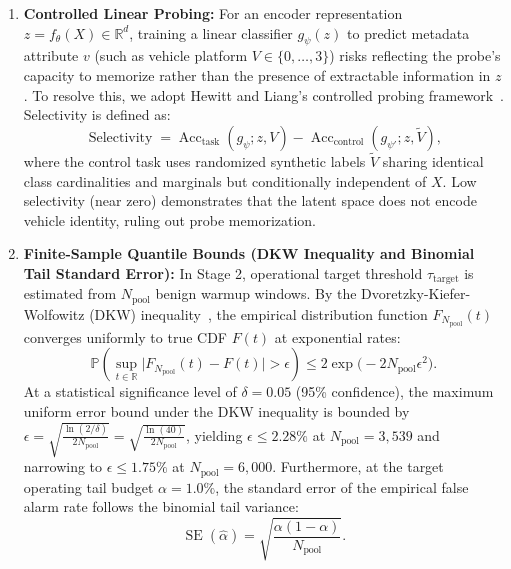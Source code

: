 \documentclass[12pt, a4paper, reqno, oneside]{book}
\begin{document}
\begin{enumerate}
    \item \textbf{Controlled Linear Probing:} For an encoder representation $z = f_\theta(X) \in \mathbb{R}^d$, training a linear classifier $g_\psi(z)$ to predict metadata attribute $v$ (such as vehicle platform $V \in \{0, \ldots, 3\}$) risks reflecting the probe's capacity to memorize rather than the presence of extractable information in $z$. To resolve this, we adopt Hewitt and Liang's controlled probing framework~\cite{hewitt2019probes}. Selectivity is defined as:
    \begin{equation}\label{eq:probe-selectivity}
    \operatorname{Selectivity} = \operatorname{Acc}_{\text{task}}(g_\psi; z, V) - \operatorname{Acc}_{\text{control}}(g_{\psi'}; z, \widetilde{V}),
    \end{equation}
    where the control task uses randomized synthetic labels $\widetilde{V}$ sharing identical class cardinalities and marginals but conditionally independent of $X$. Low selectivity (near zero) demonstrates that the latent space does not encode vehicle identity, ruling out probe memorization.
    \item \textbf{Finite-Sample Quantile Bounds (DKW Inequality and Binomial Tail Standard Error):} In Stage 2, operational target threshold $\tau_{\text{target}}$ is estimated from $N_{\text{pool}}$ benign warmup windows. By the Dvoretzky-Kiefer-Wolfowitz (DKW) inequality~\cite{massart1990dkw}, the empirical distribution function $F_{N_{\text{pool}}}(t)$ converges uniformly to true CDF $F(t)$ at exponential rates:
    \begin{equation}\label{eq:dkw-inequality}
    \mathbb{P}\left(\sup_{t \in \mathbb{R}} \big| F_{N_{\text{pool}}}(t) - F(t) \big| > \epsilon\right) \le 2\exp\big(-2 N_{\text{pool}} \epsilon^2\big).
    \end{equation}
    At a statistical significance level of $\delta = 0.05$ (95\% confidence), the maximum uniform error bound under the DKW inequality is bounded by $\epsilon = \sqrt{\frac{\ln(2/\delta)}{2 N_{\text{pool}}}} = \sqrt{\frac{\ln(40)}{2 N_{\text{pool}}}}$, yielding $\epsilon \le 2.28\%$ at $N_{\text{pool}} = 3{,}539$ and narrowing to $\epsilon \le 1.75\%$ at $N_{\text{pool}} = 6{,}000$. Furthermore, at the target operating tail budget $\alpha = 1.0\%$, the standard error of the empirical false alarm rate follows the binomial tail variance:
    \begin{equation}\label{eq:binomial-se}
    \operatorname{SE}(\hat{\alpha}) = \sqrt{\frac{\alpha(1-\alpha)}{N_{\text{pool}}}}.

\end{equation}
\end{enumerate}
\end{document}
